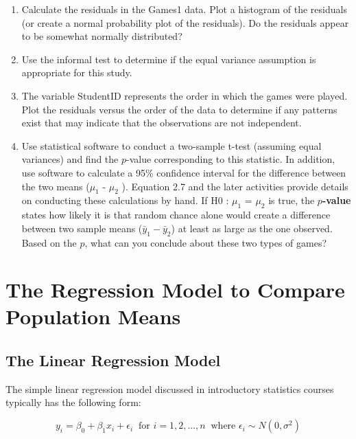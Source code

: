 \documentclass[
]{book}
\begin{document}
\begin{enumerate}
\def\labelenumi{\arabic{enumi}.}
\setcounter{enumi}{6}
\item
  Calculate the residuals in the Games1 data. Plot a histogram of the residuals (or create a normal probability plot of the residuals). Do the residuals appear to be somewhat normally distributed?
\item
  Use the informal test to determine if the equal variance assumption is appropriate for this study.
\item
  The variable StudentID represents the order in which the games were played. Plot the residuals versus the order of the data to determine if any patterns exist that may indicate that the observations are
  not independent.
\item
  Use statistical software to conduct a two-sample t-test (assuming equal variances) and find the \(p\)-value corresponding to this statistic. In addition, use software to calculate a 95\% confidence interval for
  the difference between the two means (\(\mu_1\) - \(\mu_2\) ). Equation 2.7 and the later activities provide details on conducting these calculations by hand. If H0 : \(\mu_1\) = \(\mu_2\) is true, the \textbf{\(p\)-value} states how likely it is that random chance alone would create a difference between two sample means (\(\bar{y}_1 - \bar{y}_2\)) at least as large as the one observed. Based on the \(p\), what can you conclude about these two types of
  games?
\end{enumerate}

\hypertarget{the-regression-model-to-compare-population-means}{%
\section{The Regression Model to Compare Population Means}\label{the-regression-model-to-compare-population-means}}

\hypertarget{the-linear-regression-model}{%
\subsection*{The Linear Regression Model}\label{the-linear-regression-model}}

The simple linear regression model discussed in introductory statistics courses typically has the following form:

\begin{equation} \label{2.2}
y_i = \beta_0 + \beta_1x_i + \epsilon_i ~\text{ for } i = 1, 2, ... , n ~\text{ where } \epsilon_i \sim N(0,\sigma^2)
\tag{2.2}
\end{equation}
\end{document}
